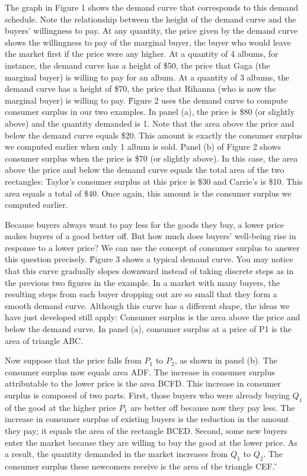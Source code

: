 
The graph in Figure 1 shows the demand curve that corresponds to this demand schedule. Note the relationship between
the height of the demand curve and the buyers' willingness to pay. At any quantity, the price given by the demand
curve shows the willingness to pay of the marginal buyer, the buyer who would leave the market first if the price
were any higher. At a quantity of 4 albums, for instance, the demand curve has a height of \$50, the price that Gaga
(the marginal buyer) is willing to pay for an album. At a quantity of 3 albums, the demand curve has a height of
\$70, the price that Rihanna (who is now the marginal buyer) is willing to pay. \v

Figure 2 uses the demand curve to compute consumer surplus in our two examples. In panel (a), the price is \$80 (or
slightly above) and the quantity demanded is 1. Note that the area above the price and below the demand curve equals
\$20. This amount is exactly the consumer surplus we computed earlier when only 1 album is sold. Panel (b) of Figure
2 shows consumer surplus when the price is \$70 (or slightly above). In this case, the area above the price and below
the demand curve equals the total area of the two rectangles: Taylor's consumer surplus at this price is \$30 and
Carrie's is \$10. This area equals a total of \$40. Once again, this amount is the consumer surplus we computed earlier.


Because buyers always want to pay less for the goods they buy, a lower price makes buyers of a good better off. But
how much does buyers' well-being rise in response to a lower price? We can use the concept of consumer surplus to
answer this question precisely. \v

Figure 3 shows a typical demand curve. You may notice that this curve gradually slopes downward instead of taking
discrete steps as in the previous two figures in the example. In a market with many buyers, the resulting steps from
each buyer dropping out are so small that they form a smooth demand curve. Although this curve has a different shape,
the ideas we have just developed still apply: Consumer surplus is the area above the price and below the demand curve.
In panel (a), consumer surplus at a price of P1 is the area of triangle ABC.


Now suppose that the price falls from $P_1$ to $P_2$, as shown in panel (b). The consumer surplus now equals area ADF.
The increase in consumer surplus attributable to the lower price is the area BCFD. This increase in consumer
surplus is composed of two parts. First, those buyers who were already buying $Q_1$ of the good at the higher price
$P_1$ are better off because now they pay less. The increase in consumer surplus of existing buyers is the reduction
in the amount they pay; it equals the area of the rectangle BCED. Second, some new buyers enter the market because
they are willing to buy the good at the lower price. As a result, the quantity demanded in the market increases from
$Q_1$ to $Q_2$. The consumer surplus these newcomers receive is the area of the triangle CEF. \v


